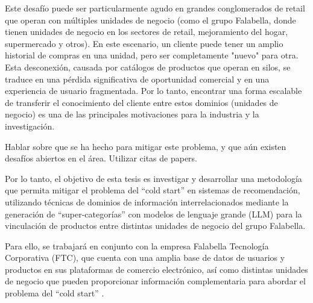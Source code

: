 Este desafío puede ser particularmente agudo en grandes conglomerados de retail que operan con múltiples unidades de negocio (como el grupo Falabella, donde tienen unidades de negocio en los sectores de retail, mejoramiento del hogar, supermercado y otros). En este escenario, un cliente puede tener un amplio historial de compras en una unidad, pero ser completamente "nuevo" para otra. Esta desconexión, causada por catálogos de productos que operan en silos, se traduce en una pérdida significativa de oportunidad comercial y en una experiencia de usuario fragmentada. Por lo tanto, encontrar una forma escalable de transferir el conocimiento del cliente entre estos dominios (unidades de negocio) es una de las principales motivaciones para la industria y la investigación.

Hablar sobre que se ha hecho para mitigar este problema, y que aún existen desafíos abiertos en el área. Utilizar citas de papers.


Por lo tanto, el objetivo de esta tesis es investigar y desarrollar una metodología que permita mitigar el problema del \enquote{cold start} en sistemas de recomendación, utilizando técnicas de dominios de información interrelacionados mediante la generación de \enquote{super-categorías} con modelos de lenguaje grande (LLM) para la vinculación de productos entre distintas unidades de negocio del grupo Falabella.

Para ello, se trabajará en conjunto con la empresa Falabella Tecnología Corporativa (FTC), que cuenta con una amplia base de datos de usuarios y productos en sus plataformas de comercio electrónico, así como distintas unidades de negocio que pueden proporcionar información complementaria para abordar el problema del \enquote{cold start} \cite{L__2012}.